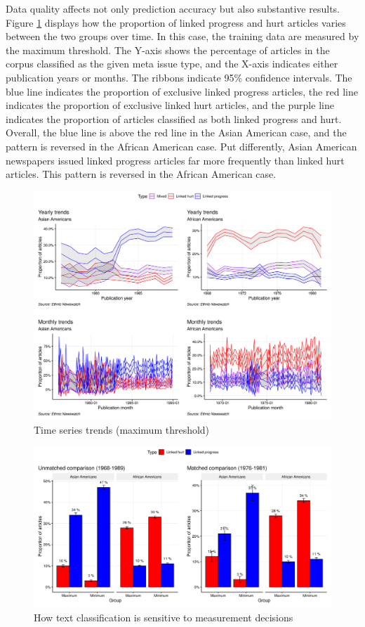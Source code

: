 \documentclass[12 pt]{article}
\begin{document}
Data quality affects not only prediction accuracy but also substantive results. Figure \ref{fig:ts_max} displays how the proportion of linked progress and hurt articles varies between the two groups over time. In this case, the training data are measured by the maximum threshold. The Y-axis shows the percentage of articles in the corpus classified as the given meta issue type, and the X-axis indicates either publication years or months. The ribbons indicate 95\% confidence intervals. The blue line indicates the proportion of exclusive linked progress articles, the red line indicates the proportion of exclusive linked hurt articles, and the purple line indicates the proportion of articles classified as both linked progress and hurt. Overall, the blue line is above the red line in the Asian American case, and the pattern is reversed in the African American case. Put differently, Asian American newspapers issued linked progress articles far more frequently than linked hurt articles. This pattern is reversed in the African American case. 

\begin{figure}[htbp!]
    \centering
    \includegraphics[width=0.8\linewidth]{time_series_plot.png}
    \caption{Time series trends (maximum threshold)}
    \label{fig:ts_max}
\end{figure}

\begin{figure}[htbp!]
    \centering
    \includegraphics[width=1\linewidth]{matched_comparison_year.png}
    \caption{How text classification is sensitive to measurement decisions}
    \label{fig:ts_unmatched}
\end{figure}
\end{document}
